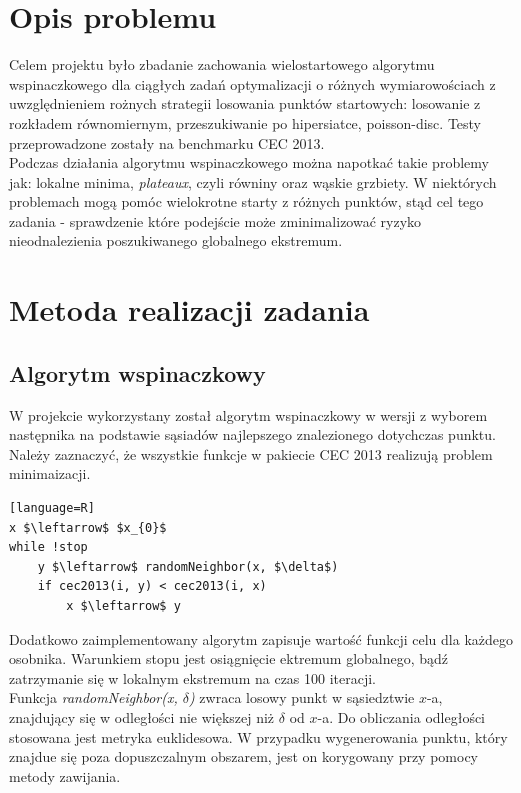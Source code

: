 \documentclass{article}
\begin{document}
\section{Opis problemu}

Celem projektu było zbadanie zachowania wielostartowego algorytmu wspinaczkowego dla ciągłych zadań optymalizacji o różnych wymiarowościach z uwzględnieniem rożnych strategii losowania punktów startowych: losowanie z rozkładem równomiernym, przeszukiwanie po hipersiatce, poisson-disc. Testy przeprowadzone zostały na benchmarku CEC 2013.\\

Podczas działania algorytmu wspinaczkowego można napotkać takie problemy jak: lokalne minima, \textit{plateaux}, czyli równiny oraz wąskie grzbiety. W niektórych problemach mogą pomóc wielokrotne starty z różnych punktów, stąd cel tego zadania - sprawdzenie które podejście może zminimalizować ryzyko nieodnalezienia poszukiwanego globalnego ekstremum.

\section{Metoda realizacji zadania}

\subsection{Algorytm wspinaczkowy}

W projekcie wykorzystany został algorytm wspinaczkowy w wersji z wyborem następnika na podstawie sąsiadów najlepszego znalezionego dotychczas punktu. \\
Należy zaznaczyć, że wszystkie funkcje w pakiecie CEC 2013 realizują problem minimaizacji.

\begin{lstlisting}[mathescape][language=R]
x $\leftarrow$ $x_{0}$
while !stop
	y $\leftarrow$ randomNeighbor(x, $\delta$)
	if cec2013(i, y) < cec2013(i, x)
		x $\leftarrow$ y
\end{lstlisting}
Dodatkowo zaimplementowany algorytm zapisuje wartość funkcji celu dla każdego osobnika. Warunkiem stopu jest osiągnięcie ektremum globalnego, bądź zatrzymanie się w lokalnym ekstremum na czas 100 iteracji.\\

Funkcja \textit{randomNeighbor(x, $\delta$)} zwraca losowy punkt w sąsiedztwie $x$-a, znajdujący się w odległości nie większej niż $\delta$ od $x$-a. Do obliczania odległości stosowana jest metryka euklidesowa. W przypadku wygenerowania punktu, który znajdue się poza dopuszczalnym obszarem, jest on korygowany przy pomocy metody zawijania.\\
\end{document}
